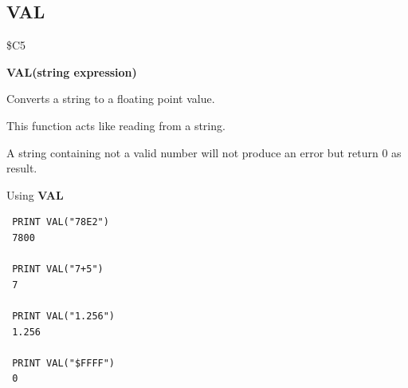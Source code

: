 
\newpage
\subsection{VAL}
\begin{description}[leftmargin=2cm,style=nextline]
\item [Token:] \$C5
\item [Format:] {\bf VAL(string expression)}
\item [Usage:] Converts a string to a floating point value.

               This function acts like reading from a string.

\item [Remarks:] A string containing not a valid number
                 will not produce an error but return 0 as result.

\item [Example:] Using {\bf VAL}
\begin{tcolorbox}[colback=black,coltext=white]
\verbatimfont{\codefont}
\begin{verbatim}
 PRINT VAL("78E2")
 7800

 PRINT VAL("7+5")
 7

 PRINT VAL("1.256")
 1.256

 PRINT VAL("$FFFF")
 0
\end{verbatim}
\end{tcolorbox}
\end{description}


\newpage
